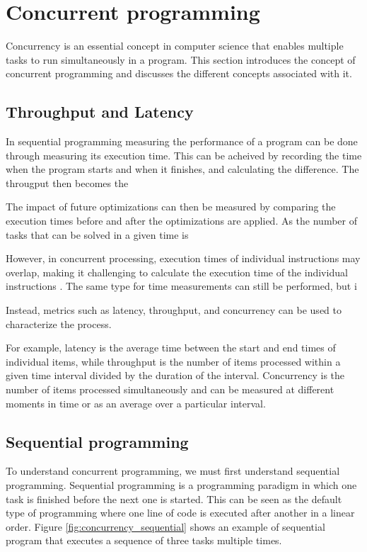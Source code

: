\section{Concurrent programming}
Concurrency is an essential concept in computer science that enables multiple tasks to run simultaneously in a program.
This section introduces the concept of concurrent programming and discusses the different concepts associated with it.


\subsection{Throughput and Latency}
In sequential programming measuring the performance of a program can be done through measuring its execution time.
This can be acheived by recording the time when the program starts and when it finishes, and calculating the difference.
The througput then becomes the

The impact of future optimizations can then be measured by comparing the execution times before and after the optimizations are applied.
As the number of tasks that can be solved in a given time is

However, in concurrent processing, execution times of individual instructions may overlap, making it challenging to calculate the execution time of the individual instructions \cite[21]{VolkovLatencyHiding2016}.
The same type for time measurements can still be performed, but i

Instead, metrics such as latency, throughput, and concurrency can be used to characterize the process.

For example, latency is the average time between the start and end times of individual items, while throughput is the number of items processed within a given time interval divided by the duration of the interval.
Concurrency is the number of items processed simultaneously and can be measured at different moments in time or as an average over a particular interval.


\subsection{Sequential programming}
To understand concurrent programming, we must first understand sequential programming.
Sequential programming is a programming paradigm in which one task is finished before the next one is started.
This can be seen as the default type of programming where one line of code is executed after another in a linear order.
Figure \ref{fig:concurrency_sequential} shows an example of sequential program that executes a sequence of three tasks multiple times.

